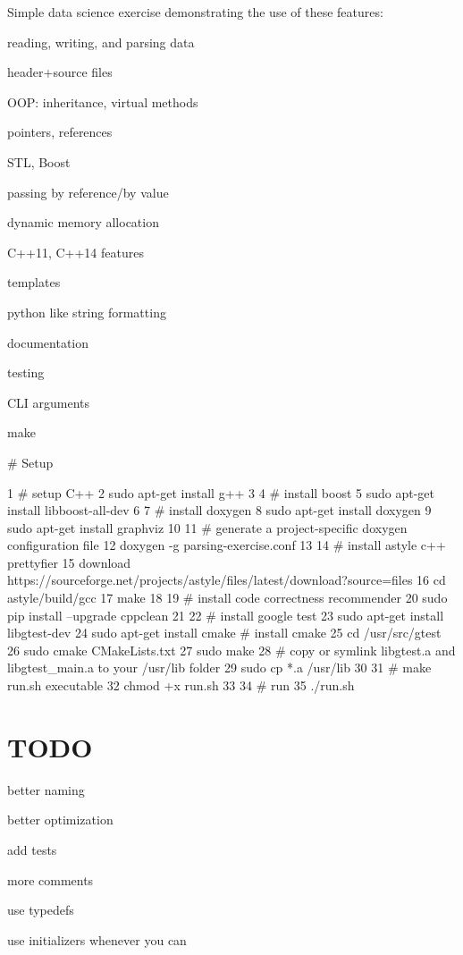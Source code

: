 Simple data science exercise demonstrating the use of these features\+:


\begin{DoxyItemize}
\item reading, writing, and parsing data
\item header+source files
\item O\+OP\+: inheritance, virtual methods
\item pointers, references
\item S\+TL, Boost
\item passing by reference/by value
\item dynamic memory allocation
\item C++11, C++14 features
\item templates
\item python like string formatting
\item documentation
\item testing
\item C\+LI arguments
\item make
\end{DoxyItemize}

\# Setup 
\begin{DoxyCode}
1 # setup C++
2 sudo apt-get install g++
3 
4 # install boost
5 sudo apt-get install libboost-all-dev
6 
7 # install doxygen
8 sudo apt-get install doxygen
9 sudo apt-get install graphviz
10 
11 # generate a project-specific doxygen configuration file
12 doxygen -g parsing-exercise.conf
13 
14 # install astyle c++ prettyfier
15 download https://sourceforge.net/projects/astyle/files/latest/download?source=files
16 cd astyle/build/gcc
17 make
18 
19 # install code correctness recommender
20 sudo pip install --upgrade cppclean
21 
22 # install google test
23 sudo apt-get install libgtest-dev
24 sudo apt-get install cmake # install cmake
25 cd /usr/src/gtest
26 sudo cmake CMakeLists.txt
27 sudo make
28 # copy or symlink libgtest.a and libgtest\_main.a to your /usr/lib folder
29 sudo cp *.a /usr/lib
30 
31 # make run.sh executable
32 chmod +x run.sh
33 
34 # run
35 ./run.sh
\end{DoxyCode}


\section*{T\+O\+DO}


\begin{DoxyItemize}
\item better naming
\item better optimization
\item add tests
\item more comments
\item use typedefs
\item use initializers whenever you can 
\end{DoxyItemize}